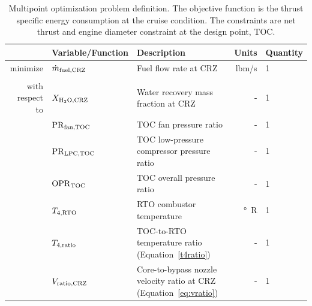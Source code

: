\documentclass[conf]{new-aiaa}
\begin{document}
\begin{table}[hbt!]
  \centering
  \caption{
    Multipoint optimization problem definition.
    The objective function is the thrust specific energy consumption at the cruise condition.
    The constraints are net thrust and engine diameter constraint at the design point, TOC.
  }
  \small
  \renewcommand{\arraystretch}{1.2}
  \begin{tabular}{r l l r l}
    \toprule
                    & Variable/Function              & Description                                                              & Units          & Quantity \\
    \hline
    minimize        & $\dot{m}_{\rm{fuel,CRZ}} $     & Fuel flow rate at CRZ                                                    & \si{lbm/s}     & 1        \\
                    &                                &                                                                          &                &          \\
    with respect to & $X_{\rm{H_2O,CRZ}}$            & Water recovery mass fraction at CRZ                                      & -              & 1        \\
                    & $\rm{PR}_{\rm{fan,TOC}}$       & TOC fan pressure ratio                                                   & -              & 1        \\
                    & $\rm{PR}_{\rm{LPC,TOC}}$       & TOC low-pressure compressor pressure ratio                               & -              & 1        \\
                    & $\rm{OPR}_{\rm{TOC}}$          & TOC overall pressure ratio                                               & -              & 1        \\
                    & $T_{4,\rm{RTO}}$               & RTO combustor temperature                                                & \si{\degree R} & 1        \\
                    & $T_{4,\rm{ratio}}$             & TOC-to-RTO temperature ratio (Equation~\eqref{t4ratio})                  & -              & 1        \\
                    & $V_{\rm{ratio,CRZ}}$           & Core-to-bypass nozzle velocity ratio at CRZ (Equation~\eqref{eq:vratio}) & -              & 1        \\

\end{tabular}
\end{table}
\end{document}
